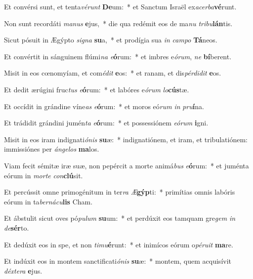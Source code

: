 \item Et convérsi sunt, et tenta\textit{vé}\textit{runt} \textbf{De}um:~* et Sanctum Israël ex\textit{a}\textit{cer}\textit{ba}\textbf{vé}runt.
\item Non sunt recordáti \textit{ma}\textit{nus} \textbf{e}jus,~* die qua redémit eos de ma\textit{nu} \textit{tri}\textit{bu}\textbf{lán}tis.
\item Sicut pósuit in Ægýpto \textit{si}\textit{gna} \textbf{su}a,~* et prodígia sua \textit{in} \textit{cam}\textit{po} \textbf{Tá}neos.
\item Et convértit in sánguinem flúmi\textit{na} \textit{e}\textbf{ó}rum:~* et imbres e\textit{ó}\textit{rum}, \textit{ne} \textbf{bí}berent.
\item Misit in eos cœnomyíam, et com\textit{é}\textit{dit} \textbf{e}os:~* et ranam, et dis\textit{pér}\textit{di}\textit{dit} \textbf{e}os.
\item Et dedit ærúgini fruc\textit{tus} \textit{e}\textbf{ó}rum:~* et labóres e\textit{ó}\textit{rum} \textit{lo}\textbf{cús}tæ.
\item Et occídit in grándine víne\textit{as} \textit{e}\textbf{ó}rum:~* et moros eó\textit{rum} \textit{in} \textit{pru}\textbf{í}na.
\item Et trádidit grándini jumén\textit{ta} \textit{e}\textbf{ó}rum:~* et possessiónem \textit{e}\textit{ó}\textit{rum} \textbf{i}gni.
\item Misit in eos iram indignati\textit{ó}\textit{nis} \textbf{su}æ:~* indignatiónem, et iram, et tribulatiónem: immissiónes per \textit{án}\textit{ge}\textit{los} \textbf{ma}los.
\item Viam fecit sémitæ iræ suæ, non pepércit a morte animá\textit{bus} \textit{e}\textbf{ó}rum:~* et juménta eórum in \textit{mor}\textit{te} \textit{con}\textbf{clú}sit.
\item Et percússit omne primogénitum in ter\textit{ra} \textit{Æ}\textbf{gýp}ti:~* primítias omnis labóris eórum in ta\textit{ber}\textit{ná}\textit{cu}\textbf{lis} Cham.
\item Et ábstulit sicut oves pó\textit{pu}\textit{lum} \textbf{su}um:~* et perdúxit eos tamquam gre\textit{gem} \textit{in} \textit{de}\textbf{sér}to.
\item Et dedúxit eos in spe, et non \textit{ti}\textit{mu}\textbf{é}runt:~* et inimícos eórum o\textit{pé}\textit{ru}\textit{it} \textbf{ma}re.
\item Et indúxit eos in montem sanctificati\textit{ó}\textit{nis} \textbf{su}æ:~* montem, quem acquisívit \textit{déx}\textit{te}\textit{ra} \textbf{e}jus.
